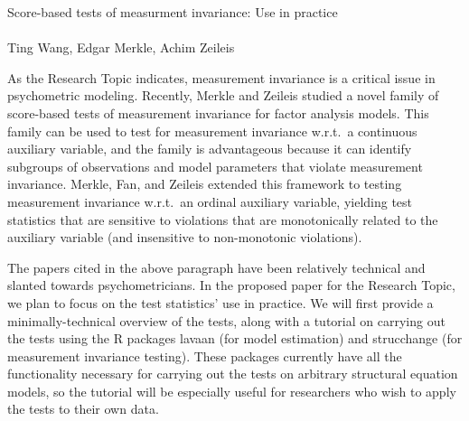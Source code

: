 \documentclass[11pt]{article}
\begin{document}
{\large
\begin{center}
 Score-based tests of measurment invariance: Use
in practice\\ \ \\

 Ting Wang, Edgar Merkle, Achim Zeileis
\end{center}}

\pagestyle{empty}





As the Research Topic indicates, measurement invariance is a critical
issue in psychometric modeling.  Recently, Merkle and
Zeileis \citeyear{MerZei13} studied a novel family of
score-based tests of 
measurement invariance for factor analysis models.  This family can
be used to test for measurement invariance w.r.t.\ a continuous
auxiliary variable, and the family is advantageous because it can
identify subgroups of observations and model parameters that violate
measurement invariance.  Merkle, Fan, and Zeileis \citeyear{MerFanZei}
extended this framework to testing measurement invariance w.r.t.\ an
ordinal 
auxiliary variable, yielding test statistics that are sensitive to
violations that are monotonically related to the auxiliary variable
(and insensitive to non-monotonic violations).

The papers cited in the above paragraph have been relatively technical
and slanted towards psychometricians.  In the proposed paper for the
Research Topic, we plan to focus on the 
test statistics' use in practice.  We will first provide a 
minimally-technical overview of the tests, along with a tutorial on
carrying out the tests using the R packages lavaan (for model
estimation) and strucchange (for measurement invariance testing).
These packages currently have all the functionality necessary for
carrying out the tests on arbitrary structural equation models, so the
tutorial will be especially useful for researchers who wish to apply
the tests to their own data.
\end{document}
